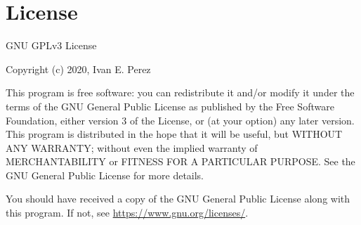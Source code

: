  \section{License}
\noindent GNU GPLv3 License

\medskip
\noindent Copyright (c) 2020, Ivan E. Perez

\medskip
\noindent This program is free software: you can redistribute it and/or modify
it under the terms of the GNU General Public License as published by
the Free Software Foundation, either version 3 of the License, or
(at your option) any later version.
\smallskip
\noindent This program is distributed in the hope that it will be useful,
but WITHOUT ANY WARRANTY; without even the implied warranty of
MERCHANTABILITY or FITNESS FOR A PARTICULAR PURPOSE.  See the
GNU General Public License for more details.
\smallskip

\noindent You should have received a copy of the GNU General Public License
along with this program.  If not, see \href{https://www.gnu.org/licenses/}{https://www.gnu.org/licenses/}.